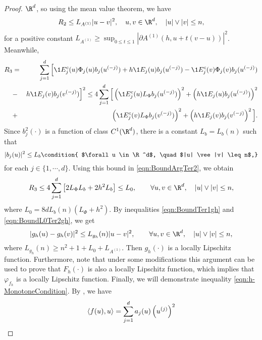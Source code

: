 \begin{proof}
$\R^d$, so using the mean value theorem,
we have
\begin{equation}\label{eqn:BoundTer1gh}
R_2
\leq
L_{A^{(1)}}|u-v|^2, \quad u,v \in \R^d, \quad |u|\vee |v|\leq n,
\end{equation}
for a positive constant $L_{A^{(1)}} \geq \sup_{0\leq t \leq 1} 
|\partial A^{(1)}(h, u+t(v-u))|^2$. Meanwhile, 
\begin{eqnarray}
R_3 &=&\sum_{j=1}^d\Big[\1{E_j^c}(u) \Phi_j(u) b_j(u^{(-j)}) + h \1{E_j}(u) b_j(u^{(-j)}) 
-\1{E_j^c}(v) \Phi_j(v) b_j(u^{(-j)})\nonumber \\ &-& h \1{E_j}(v) b_j(v^{(-j)})
\Big]^2 
\leq
4\sum_{j=1}^d
\Big[
\left(	
\1{E_j^c}(u) L_{\Phi} b_j(u^{(-j)})  
\right)^2
+
\left(
h \1{E_j}(u) b_j(u^{(-j)})
\right)^2
\nonumber\\&+&
\left(
\1{E_j^c}(v) L_{\Phi} b_j(v^{(-j)})
\right)^2
+
\left(
h \1{E_j}(v) b_j(v^{(-j)}
\right)^2
\Big].
\label{eqn:BoundArgTer2}	
\end{eqnarray}	
Since  $b^2_j(\cdot)$ is a function of class $C^1(\R^d)$, there is a 
constant $L_b=L_b(n)$ such that
\begin{dmath}[label={eqn:Boundbju}]
	|b_j(u)|^2 \leq L_b 
	\condition{
		$\forall u \in \R^d$,
		\quad $|u| \vee |v| \leq n$,}		
\end{dmath}
for each $j \in \{1,\cdots, d\}$. Using this bound in  \eqref{eqn:BoundArgTer2}, we obtain
\begin{equation}\label{eqn:BoundL0Ter2gh}
R_3\leq
4 \sum_{j=1}^d
\left[
2 L_{\Phi} L_b +2h^2 L_b
\right] 
\leq L_0, \qquad
\forall u,v \in \R^d,
\quad |u|\vee|v| \leq n,
\end{equation}
where $L_0=8d L_b(n)(L_{\Phi}+h^2)$.
By inequalities \eqref{eqn:BoundTer1gh} and \eqref{eqn:BoundL0Ter2gh},  we get
\begin{equation}
|g_h(u) - g_h(v)|^2 \leq L_{g_h}(n) |u - v|^2, 
\qquad	\forall u,v \in \R^d,
\quad |u|\vee |v| \leq n,		
\end{equation}
where $L_{g_h}(n)\geq n^2+1+L_0+ L_{A^{(1)}}$. Then $g_h(\cdot)$ is a locally 
Lipschitz function. Furthermore, note that under some modifications
this argument can be used to prove that $F_h(\cdot)$ is also a locally Lipschitz 
function, which implies that $\varphi_{f_{h}}$ is a locally Lipschitz function.
Finally, we  will demonstrate inequality \eqref{eqn:h-MonotoneCondition}. 
By , we have
\begin{equation*}\label{eqn:bDotProdBound}
	\innerprod{f(u)}{u}
	=
	\sum_{j=1}^d
	a_j(u) \left( u^{(j)} \right)^2

\end{equation*}
\end{proof}
